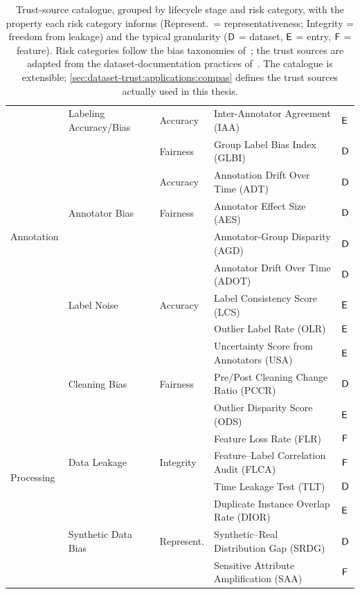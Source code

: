 \begin{table}[!htbp]
\begin{tabular}{@{}lllll@{}}
    \midrule
    \multirow{9}{*}{Annotation}
      & Labeling Accuracy/Bias & Accuracy   & Inter-Annotator Agreement (IAA)     & $\textsf{E}$ \\
      &                        & Fairness   & Group Label Bias Index (GLBI)       & $\textsf{D}$ \\
      &                        & Accuracy   & Annotation Drift Over Time (ADT)    & $\textsf{D}$ \\
      & Annotator Bias         & Fairness   & Annotator Effect Size (AES)         & $\textsf{D}$ \\
      &                        &            & Annotator-Group Disparity (AGD)     & $\textsf{D}$ \\
      &                        &            & Annotator Drift Over Time (ADOT)    & $\textsf{D}$ \\
      & Label Noise            & Accuracy   & Label Consistency Score (LCS)       & $\textsf{E}$ \\
      &                        &            & Outlier Label Rate (OLR)            & $\textsf{E}$ \\
      &                        &            & Uncertainty Score from Annotators (USA) & $\textsf{E}$ \\
    \midrule
    \multirow{8}{*}{Processing}
      & Cleaning Bias          & Fairness   & Pre/Post Cleaning Change Ratio (PCCR) & $\textsf{D}$ \\
      &                        &            & Outlier Disparity Score (ODS)         & $\textsf{E}$ \\
      &                        &            & Feature Loss Rate (FLR)               & $\textsf{F}$ \\
      & Data Leakage           & Integrity  & Feature--Label Correlation Audit (FLCA) & $\textsf{F}$ \\
      &                        &            & Time Leakage Test (TLT)               & $\textsf{D}$ \\
      &                        &            & Duplicate Instance Overlap Rate (DIOR) & $\textsf{E}$ \\
      & Synthetic Data Bias    & Represent. & Synthetic--Real Distribution Gap (SRDG) & $\textsf{D}$ \\
      &                        &            & Sensitive Attribute Amplification (SAA) & $\textsf{F}$ \\
    \bottomrule
  \end{tabular}
  \caption{Trust-source catalogue, grouped by lifecycle stage and risk category, with the property each risk category informs (Represent.\ = representativeness; Integrity = freedom from leakage) and the typical granularity ($\textsf{D}$ = dataset, $\textsf{E}$ = entry, $\textsf{F}$ = feature). Risk categories follow the bias taxonomies of~\cite{10.1145/3457607,Suresh_2021}; the trust sources are adapted from the dataset-documentation practices of~\cite{gebru2018datasheets,Pushkarna2022DataCP}. The catalogue is extensible; \cref{sec:dataset-trust:applications:compas} defines the trust sources actually used in this thesis.}
  \label{tab:dataset-trust:catalogue}
\end{table}

